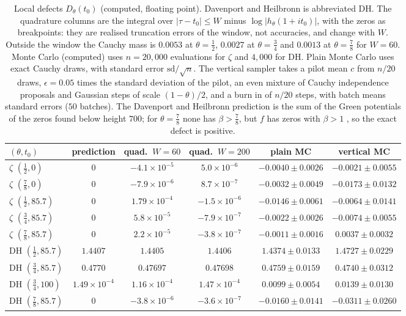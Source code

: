 \begin{table}[h]
\centering\scriptsize\setlength{\tabcolsep}{2pt}
\begin{tabular}{lccccc}
\toprule
$(\theta,t_0)$ & prediction & quad.\ $W=60$ & quad.\ $W=200$ & plain MC & vertical MC\\
\midrule
$\zeta$ $(\frac12,0)$ & $0$ & $-4.1\times10^{-5}$ & $5.0\times10^{-6}$ & $-0.0040\pm0.0026$ & $-0.0021\pm0.0055$\\
$\zeta$ $(\frac78,0)$ & $0$ & $-7.9\times10^{-6}$ & $8.7\times10^{-7}$ & $-0.0032\pm0.0049$ & $-0.0173\pm0.0132$\\
$\zeta$ $(\frac12,85.7)$ & $0$ & $1.79\times10^{-4}$ & $-1.5\times10^{-6}$ & $-0.0146\pm0.0061$ & $-0.0064\pm0.0141$\\
$\zeta$ $(\frac34,85.7)$ & $0$ & $5.8\times10^{-5}$ & $-7.9\times10^{-7}$ & $-0.0022\pm0.0026$ & $-0.0074\pm0.0055$\\
$\zeta$ $(\frac78,85.7)$ & $0$ & $2.2\times10^{-5}$ & $-3.8\times10^{-7}$ & $-0.0011\pm0.0016$ & $0.0037\pm0.0032$\\
DH $(\frac12,85.7)$ & $1.4407$ & $1.4405$ & $1.4406$ & $1.4374\pm0.0133$ & $1.4727\pm0.0229$\\
DH $(\frac34,85.7)$ & $0.4770$ & $0.47697$ & $0.47698$ & $0.4759\pm0.0159$ & $0.4740\pm0.0312$\\
DH $(\frac34,100)$ & $1.49\times10^{-4}$ & $1.16\times10^{-4}$ & $1.47\times10^{-4}$ & $0.0099\pm0.0054$ & $0.0139\pm0.0130$\\
DH $(\frac78,85.7)$ & $0$ & $-3.8\times10^{-6}$ & $-3.6\times10^{-7}$ & $-0.0160\pm0.0141$ & $-0.0311\pm0.0260$\\
\bottomrule
\end{tabular}
\caption{Local defects $D_\theta(t_0)$ (computed, floating point). Davenport and Heilbronn is abbreviated DH. The quadrature columns are the integral over $|\tau-t_0|\le W$ minus $\log|h_\theta(1+it_0)|$, with the zeros as breakpoints: they are realised truncation errors of the window, not accuracies, and change with $W$. Outside the window the Cauchy mass is $0.0053$ at $\theta=\frac12$, $0.0027$ at $\theta=\frac34$ and $0.0013$ at $\theta=\frac78$ for $W=60$. Monte Carlo (computed) uses $n=20{,}000$ evaluations for $\zeta$ and $4{,}000$ for DH. Plain Monte Carlo uses exact Cauchy draws, with standard error $\mathrm{sd}/\sqrt n$. The vertical sampler takes a pilot mean $c$ from $n/20$ draws, $\epsilon=0.05$ times the standard deviation of the pilot, an even mixture of Cauchy independence proposals and Gaussian steps of scale $(1-\theta)/2$, and a burn in of $n/20$ steps, with batch means standard errors ($50$ batches). The Davenport and Heilbronn prediction is the sum of the Green potentials of the zeros found below height $700$; for $\theta=\frac78$ none has $\beta>\frac78$, but $f$ has zeros with $\beta>1$ \cite{DH36}, so the exact defect is positive.}\label{bsy:tab:defects}
\end{table}

